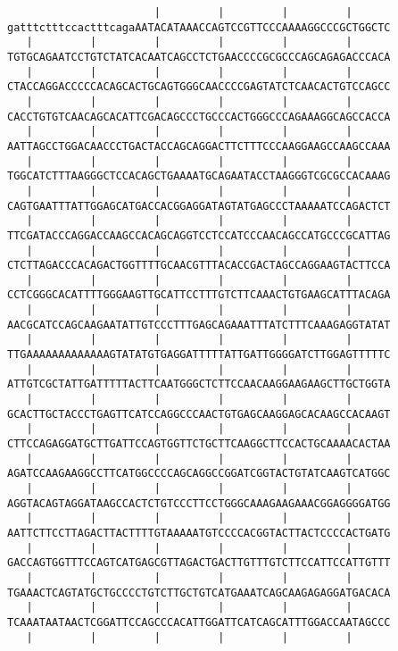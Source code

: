 \documentclass{article}
\begin{document}
\begin{Verbatim}
                       |         |         |         |      
gatttctttccactttcagaAATACATAAACCAGTCCGTTCCCAAAAGGCCCGCTGGCTC
   |         |         |         |         |         |      
TGTGCAGAATCCTGTCTATCACAATCAGCCTCTGAACCCCGCGCCCAGCAGAGACCCACA
   |         |         |         |         |         |      
CTACCAGGACCCCCACAGCACTGCAGTGGGCAACCCCGAGTATCTCAACACTGTCCAGCC
   |         |         |         |         |         |      
CACCTGTGTCAACAGCACATTCGACAGCCCTGCCCACTGGGCCCAGAAAGGCAGCCACCA
   |         |         |         |         |         |      
AATTAGCCTGGACAACCCTGACTACCAGCAGGACTTCTTTCCCAAGGAAGCCAAGCCAAA
   |         |         |         |         |         |      
TGGCATCTTTAAGGGCTCCACAGCTGAAAATGCAGAATACCTAAGGGTCGCGCCACAAAG
   |         |         |         |         |         |      
CAGTGAATTTATTGGAGCATGACCACGGAGGATAGTATGAGCCCTAAAAATCCAGACTCT
   |         |         |         |         |         |      
TTCGATACCCAGGACCAAGCCACAGCAGGTCCTCCATCCCAACAGCCATGCCCGCATTAG
   |         |         |         |         |         |      
CTCTTAGACCCACAGACTGGTTTTGCAACGTTTACACCGACTAGCCAGGAAGTACTTCCA
   |         |         |         |         |         |      
CCTCGGGCACATTTTGGGAAGTTGCATTCCTTTGTCTTCAAACTGTGAAGCATTTACAGA
   |         |         |         |         |         |      
AACGCATCCAGCAAGAATATTGTCCCTTTGAGCAGAAATTTATCTTTCAAAGAGGTATAT
   |         |         |         |         |         |      
TTGAAAAAAAAAAAAAGTATATGTGAGGATTTTTATTGATTGGGGATCTTGGAGTTTTTC
   |         |         |         |         |         |      
ATTGTCGCTATTGATTTTTACTTCAATGGGCTCTTCCAACAAGGAAGAAGCTTGCTGGTA
   |         |         |         |         |         |      
GCACTTGCTACCCTGAGTTCATCCAGGCCCAACTGTGAGCAAGGAGCACAAGCCACAAGT
   |         |         |         |         |         |      
CTTCCAGAGGATGCTTGATTCCAGTGGTTCTGCTTCAAGGCTTCCACTGCAAAACACTAA
   |         |         |         |         |         |      
AGATCCAAGAAGGCCTTCATGGCCCCAGCAGGCCGGATCGGTACTGTATCAAGTCATGGC
   |         |         |         |         |         |      
AGGTACAGTAGGATAAGCCACTCTGTCCCTTCCTGGGCAAAGAAGAAACGGAGGGGATGG
   |         |         |         |         |         |      
AATTCTTCCTTAGACTTACTTTTGTAAAAATGTCCCCACGGTACTTACTCCCCACTGATG
   |         |         |         |         |         |      
GACCAGTGGTTTCCAGTCATGAGCGTTAGACTGACTTGTTTGTCTTCCATTCCATTGTTT
   |         |         |         |         |         |      
TGAAACTCAGTATGCTGCCCCTGTCTTGCTGTCATGAAATCAGCAAGAGAGGATGACACA
   |         |         |         |         |         |      
TCAAATAATAACTCGGATTCCAGCCCACATTGGATTCATCAGCATTTGGACCAATAGCCC
   |         |         |         |         |         |      

\end{Verbatim}
\end{document}
